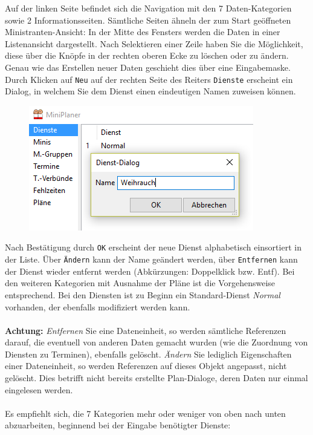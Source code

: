 \documentclass[a4paper,11pt]{article}
\begin{document}
Auf der linken Seite befindet sich die Navigation mit den 7 Daten-Kategorien sowie 2 Informationsseiten. Sämtliche Seiten ähneln der zum Start geöffneten Ministranten-Ansicht: In der Mitte des Fensters werden die Daten in einer Listenansicht dargestellt. Nach Selektieren einer Zeile haben Sie die Möglichkeit, diese über die Knöpfe in der rechten oberen Ecke zu löschen oder zu ändern. Genau wie das Erstellen neuer Daten geschieht dies über eine Eingabemaske.\\
Durch Klicken auf \texttt{Neu} auf der rechten Seite des Reiters \texttt{Dienste} erscheint ein Dialog, in welchem Sie dem Dienst einen eindeutigen Namen zuweisen können.
\begin{figure}[h]
\includegraphics[scale=0.6]{dienste2.PNG}
\end{figure}
Nach Bestätigung durch \texttt{OK} erscheint der neue Dienst alphabetisch einsortiert in der Liste. Über \texttt{Ändern} kann der Name geändert werden, über \texttt{Entfernen} kann der Dienst wieder entfernt werden (Abkürzungen: Doppelklick bzw. Entf). Bei den weiteren Kategorien mit Ausnahme der Pläne ist die Vorgehensweise entsprechend. Bei den Diensten ist zu Beginn ein Standard-Dienst \textit{Normal} vorhanden, der ebenfalls modifiziert werden kann.\\
\\
\textbf{Achtung:} \textit{Entfernen} Sie eine Dateneinheit, so werden sämtliche Referenzen darauf, die eventuell von anderen Daten gemacht wurden (wie die Zuordnung von Diensten zu Terminen), ebenfalls gelöscht. \textit{Ändern} Sie lediglich Eigenschaften einer Dateneinheit, so werden Referenzen auf dieses Objekt angepasst, nicht gelöscht. Dies betrifft nicht bereits erstellte Plan-Dialoge, deren Daten nur einmal eingelesen werden. \\
\\
Es empfiehlt sich, die 7 Kategorien mehr oder weniger von oben nach unten abzuarbeiten, beginnend bei der Eingabe benötigter Dienste:
\end{document}
